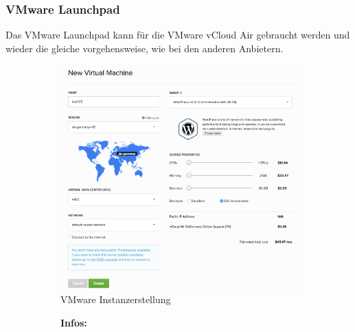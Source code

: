 \subsubsection{VMware Launchpad\autocite{vmware}}
Das VMware Launchpad kann für die VMware vCloud Air gebraucht werden und wieder 
die gleiche vorgehensweise, wie bei den anderen Anbietern.
\begin{figure}[!htbp]
   \begin{subfigure}[b]{.6\textwidth}

\includegraphics[width=\textwidth]{./03_Analyse/03_Bitnami/images/vmware_creation}
\caption{VMware Instanzerstellung}
   \end{subfigure}
     \hfill
   \begin{subfigure}[b]{.39\textwidth}
  \centering
\textbf{Infos:}\\

\end{subfigure}
\end{figure}
